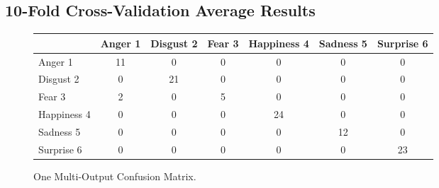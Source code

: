 \documentclass[a4paper,11pt]{article}
\begin{document}
\subsection{10-Fold Cross-Validation Average Results}


\begin{figure}[h]                                                               
\begin{center}                                                                  
     \begin{tabular}{ | l || c | c | c | c | c | c | }                           
     \hline                                                                      
           & Anger 1 & Disgust 2 & Fear 3 & Happiness 4 & Sadness 5 & Surprise 6 \\ \hline \hline
         Anger 1 		& 11 & 0 & 0 & 0 & 0 & 0 \\ \hline                               
         Disgust 2 		& 0 & 21 & 0 & 0 & 0 & 0 \\ \hline                            
         Fear 3 		& 2 & 0 & 5 & 0 & 0 & 0 \\ \hline                                
         Happiness 4 	& 0 & 0 & 0 & 24 & 0 & 0 \\ \hline                          
         Sadness 5 		& 0 & 0 & 0 & 0 & 12 & 0 \\ \hline                             
         Surprise 6 	& 0 & 0 & 0 & 0 & 0 & 23 \\ \hline                           
     \end{tabular}                                                               
     \caption{One Multi-Output Confusion Matrix.}
     \label{fig:oneConfusionMatrix}                                                 
\end{center}                                                                    
\end{figure}   
\end{document}
